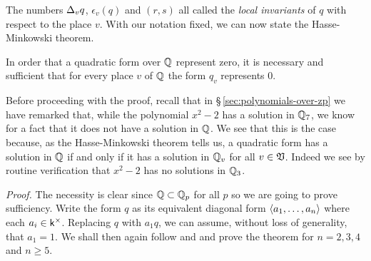 The numbers \({\Delta}_v q\), \(\epsilon_v(q)\) and \((r, s)\) all called the \emph{local invariants} of \(q\) with respect to the place \(v\). With our notation fixed, we can now state the Hasse-Minkowski theorem.

\begin{theoremx}\label{thm:hasse-minkowski}
    In order that a quadratic form over \(\mathbb{Q}\) represent zero, it is necessary and sufficient that for every place \(v\) of \(\mathbb{Q}\) the form \(q_v\) represents \(0\).
\end{theoremx}

Before proceeding with the proof, recall that in \S\,\ref{sec:polynomials-over-zp} we have remarked that, while the polynomial \(x^2 - 2\) has a solution in \(\mathbb{Q}_7\), we know for a fact that it does not have a solution in \(\mathbb{Q}\). We see that this is the case because, as the Hasse-Minkowski theorem tells us, a quadratic form has a solution in \(\mathbb{Q}\) if and only if it has a solution in \(\mathbb{Q}_v\) for all \(v \in \mathfrak{V}\). Indeed we see by routine verification that \(x^2 - 2\) has no solutions in \(\mathbb{Q}_3\).


\emph{Proof.} The necessity is clear since \(\mathbb{Q} \subset \mathbb{Q}_p\) for all \(p\) so we are going to prove sufficiency. Write the form \(q\) as its equivalent diagonal form \(\langle a_1, \dots, a_n \rangle\) where each \(a_i \in \mathsf{k}^{\times}\). Replacing \(q\) with \(a_1 q\), we can assume, without loss of generality, that \(a_1 = 1\). We shall then again follow \cite[pp.~41--44]{serre2012course} and \cite[pp.~102--104]{gerstein2008basic} and prove the theorem for \(n = 2, 3, 4\) and \(n \geq 5.\)

